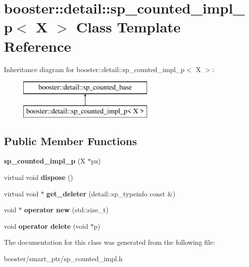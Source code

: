 \section{booster\-:\-:detail\-:\-:sp\-\_\-counted\-\_\-impl\-\_\-p$<$ X $>$ Class Template Reference}
\label{classbooster_1_1detail_1_1sp__counted__impl__p}
Inheritance diagram for booster\-:\-:detail\-:\-:sp\-\_\-counted\-\_\-impl\-\_\-p$<$ X $>$\-:\begin{figure}[H]
\begin{center}
\leavevmode
\includegraphics[height=2.000000cm]{classbooster_1_1detail_1_1sp__counted__impl__p}
\end{center}
\end{figure}
\subsection*{Public Member Functions}
\begin{DoxyCompactItemize}
\item 
{\bfseries sp\-\_\-counted\-\_\-impl\-\_\-p} (X $\ast$px)\label{classbooster_1_1detail_1_1sp__counted__impl__p_a99b31848393c18b1fb789e4c06f92f83}

\item 
virtual void {\bfseries dispose} ()\label{classbooster_1_1detail_1_1sp__counted__impl__p_a7ef73e7619b003920e0e9b550f22df1d}

\item 
virtual void $\ast$ {\bfseries get\-\_\-deleter} (detail\-::sp\-\_\-typeinfo const \&)\label{classbooster_1_1detail_1_1sp__counted__impl__p_a6085f84628eb386305c8c4fd9cfb4701}

\item 
void $\ast$ {\bfseries operator new} (std\-::size\-\_\-t)\label{classbooster_1_1detail_1_1sp__counted__impl__p_af4e588d7cd60223036e738dbc819efeb}

\item 
void {\bfseries operator delete} (void $\ast$p)\label{classbooster_1_1detail_1_1sp__counted__impl__p_a011c5b981adb2dc4b31886c9701381b9}

\end{DoxyCompactItemize}


The documentation for this class was generated from the following file\-:\begin{DoxyCompactItemize}
\item 
booster/smart\-\_\-ptr/sp\-\_\-counted\-\_\-impl.\-h\end{DoxyCompactItemize}
